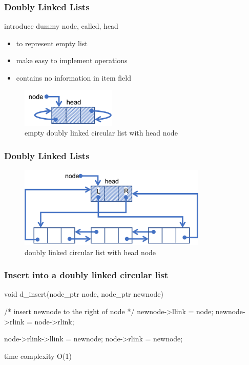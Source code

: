 \documentclass[newPxFont,sthlmFooter,nooffset]{beamer}
\begin{document}
\begin{frame}[t]
  \frametitle{Doubly Linked Lists}
introduce dummy node, called, head
\begin{itemize}
\item to represent empty list
\item make easy to implement operations 
\item contains no information in item field
\end{itemize}
\bigskip
\begin{figure}
  \begin{center}
    \includegraphics[width=0.4\textwidth]{figures/fig09_double_head.png}
    \caption{empty doubly linked circular list with head node}
  \end{center}
\end{figure}
\end{frame}

\begin{frame}[t]
  \frametitle{Doubly Linked Lists}
  \begin{figure}
  \begin{center}
    \includegraphics[width=0.8\textwidth]{figures/fig09_double_head1.png}
    \caption{doubly linked circular list with head node}
  \end{center}
\end{figure}
\end{frame}

\begin{frame}[t, fragile]
  \frametitle{Insert into a doubly linked circular list}
  \begin{ncodedef}
void d_insert(node_ptr node, node_ptr newnode) {
    /* insert newnode to the right of node */ 
    newnode->llink = node;
    newnode->rlink = node->rlink; 

    node->rlink->llink = newnode; 
    node->rlink = newnode;
}    
  \end{ncodedef}

time complexity O(1)
\end{frame}
\end{document}
